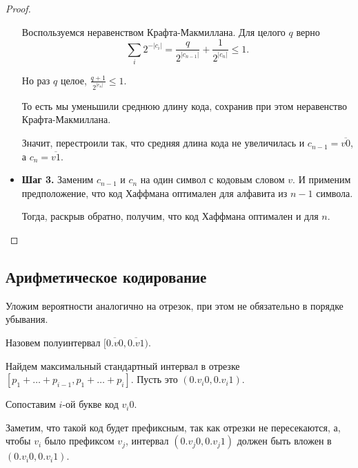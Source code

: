\begin{proof}
\begin{itemize}
		Воспользуемся неравенством Крафта-Макмиллана. Для целого $q$ верно 
		$$\sum_i 2^{-|c_i|} = \frac{q}{2^{|c_{n-1}|}} + \frac{1}{2^{|c_n|}} \le 1.$$ 

		Но раз $q$ целое, $\frac{q+1}{2^{\lvert c_n \rvert }} \le 1$. 

		То есть мы уменьшили среднюю длину кода, сохранив при этом неравенство Крафта-Макмиллана.

		Значит, перестроили так, что средняя длина кода не увеличилась и $c_{n-1} = \overline{v0}$, а $c_n = \overline{v1}$.
	\item \textbf{Шаг 3.} Заменим $c_{n-1}$ и $c_n$ на один символ с кодовым словом $v$.
		И применим предположение, что код Хаффмана оптимален для алфавита из $n-1$ символа.

		Тогда, раскрыв обратно, получим, что код Хаффмана оптимален и для $n$.
\end{itemize}
\end{proof}

\subsection{Арифметическое кодирование}
Уложим вероятности аналогично на отрезок, при этом не обязательно в порядке убывания.

Назовем  полуинтервал $ \bigl[\overline{0. v 0}, \overline{0. v 1}\bigr)$. 

Найдем максимальный стандартный интервал в отрезке $[p_1 + \dots +p_{i-1}, p_1 + \dots + p_i]$. Пусть это $ (0.v_i 0, 0.v_i 1)$.

Сопоставим $ i$-ой букве код $ v_i 0$.

Заметим, что такой код будет префиксным, так как отрезки не пересекаются, а, чтобы $ v_i$ было префиксом $ v_j$, интервал  $ (0.v_j 0, 0.v_j 1)$ должен быть вложен в $ (0.v_i 0, 0.v_i 1)$.


